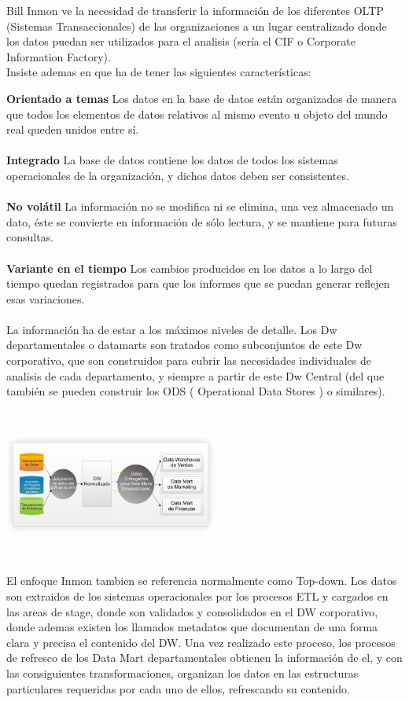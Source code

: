 \documentclass[twoside,twocolumn]{article}
\begin{document}
\begin{enumerate}
Bill Inmon ve la necesidad de transferir la información de los diferentes OLTP (Sistemas Transaccionales) de las organizaciones a un lugar centralizado donde los datos puedan ser utilizados para el analisis (sería el CIF o Corporate Information Factory).\\

Insiste ademas en que ha de tener las siguientes características:

\textbf{Orientado a temas} Los datos en la base de datos están organizados de manera que todos los elementos de datos relativos al mismo evento u objeto del mundo real queden unidos entre sí.
\\ \\
\textbf{Integrado} La base de datos contiene los datos de todos los sistemas operacionales de la organización, y dichos datos deben ser consistentes.
\\ \\
\textbf{No volátil} La información no se modifica ni se elimina, una vez almacenado un dato, éste se convierte en información de sólo lectura, y se mantiene para futuras consultas.
\\ \\
\textbf{Variante en el tiempo} Los cambios producidos en los datos a lo largo del tiempo quedan registrados para que los informes que se puedan generar reflejen esas variaciones.
\\ \\
La información ha de estar a los máximos niveles de detalle. Los Dw departamentales o datamarts son tratados como subconjuntos de este Dw corporativo, que son construidos para cubrir las necesidades individuales de analisis de cada departamento, y siempre a partir de este Dw Central (del que también se pueden construir los ODS ( Operational Data Stores ) o similares).

\includegraphics[width=7cm, height=5cm]{Imagenes/enfoque-inmon}

El enfoque Inmon tambien se referencia normalmente como Top-down. Los datos son extraidos de los sistemas operacionales por los procesos ETL y cargados en las areas de stage, donde son validados y consolidados en el DW corporativo, donde ademas existen los llamados metadatos que documentan de una forma clara y precisa el contenido del DW. Una vez realizado este proceso, los procesos de refresco de los Data Mart departamentales obtienen la información de el, y con las consiguientes transformaciones, organizan los datos en las estructuras particulares requeridas por cada uno de ellos, refrescando su contenido.


\end{enumerate}
\end{document}
